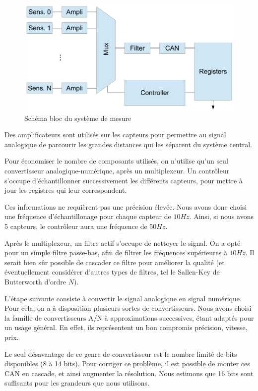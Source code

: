 \documentclass[a4paper,oneside,11pt]{article}  %
\begin{document}
\begin{figure}[h!]
	\centering
	\includegraphics[scale=0.8]{sensor.pdf}
	\caption{Schéma bloc du système de mesure}
\end{figure}

Des amplificateurs sont utilisés sur les capteurs pour permettre au signal analogique de parcourir les grandes distances qui les séparent du système central.

Pour économiser le nombre de composants utilisés, on n'utilise qu'un seul convertisseur analogique-numérique, après un multiplexeur.
Un contrôleur s'occupe d'échantillonner successivement les différents capteurs, pour mettre à jour les registres qui leur correspondent.

Ces informations ne requièrent pas une précision élevée.
Nous avons donc choisi une fréquence d'échantillonage pour chaque capteur de $10 H\!z$.
Ainsi, si nous avons 5 capteurs, le contrôleur aura une fréquence de $50 H\!z$.

Après le multiplexeur, un filtre actif s'occupe de nettoyer le signal.
On a opté pour un simple filtre passe-bas, afin de filtrer les fréquences supérieures à $10 H\!z$.
Il serait bien sûr possible de cascader ce filtre pour améliorer la qualité (et éventuellement considérer d'autres types de filtres, tel le Sallen-Key de Butterworth d'ordre $N$).

L'étape suivante consiste à convertir le signal analogique en signal numérique.
Pour cela, on a à disposition plusieurs sortes de convertisseurs.
Nous avons choisi la famille de convertisseurs A/N à approximations successives, étant adaptés pour un usage général.
En effet, ils représentent un bon compromis précision, vitesse, prix.

Le seul désavantage de ce genre de convertisseur est le nombre limité de bits disponibles (8 à 14 bits).
Pour corriger ce problème, il est possible de monter ces CAN en cascade, et ainsi augmenter la résolution.
Nous estimons que 16 bits sont suffisants pour les grandeurs que nous utilisons.
\end{document}

